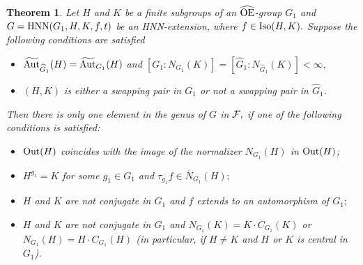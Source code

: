 \documentclass[a4paper,12pt]{article}
\newtheorem{thm}{Theorem}[section]
\newcommand{\Oe}{\rm \widehat{OE}}
\newcommand{\F}{{\cal F}}
\def\aut {{\rm Aut}}
\def\out {{\rm Out}}
\def\inn {{\rm Inn}}
\def\hnn {{\rm HNN}}
\def\Iso {{\rm Iso}}
\begin{document}
\begin{thm}\label{genus 1 intr}
Let $H$ and $K$ be a finite subgroups of an $\Oe$-group $G_1$ and $G=\hnn(G_1, H, K, f, t)$ be an HNN-extension, where $f \in \Iso(H, K).$ 
Suppose the following conditions are satisfied \begin{itemize}
    \item $\widetilde{\aut}_{\widehat{G}_1}(H)=\widetilde{\aut}_{G_1}(H)$ and $[G_1:N_{G_1}(K)]=[\widehat G_1:N_{\widehat G_1}(K)]<\infty$,
    \item  $(H,K)$ is either a swapping pair in $G_1$ or not a swapping pair in $\widehat G_1$. 

\end{itemize} Then there is only one element in the genus of $G$ in $\F,$ if one of the following conditions is satisfied:

\begin{itemize}


\item[i)]  $\out(H)$  coincides with the image of the normalizer $N_{G_1}(H)$ in $\out(H)$;

\item[ii)] %
$H^{g_1}=K$ for some $g_1 \in G_1$ and $\tau_{g_1} f\in \overline{N}_{G_1}(H);$

    \item [iii)] $H$ and $K$ are not conjugate in $G_1$ and $f$ extends to an automorphism of $G_1;$  
    \item [iv)] $H$ and $K$ are not conjugate in $G_1$ and $N_{G_1}(K)=K \cdot C_{G_1}(K)$ or $N_{G_1}(H)=H \cdot C_{G_1}(H)$ (in particular, if $H \neq K$ and $H$ or $K$ is central in $G_1$).  
\end{itemize}
\end{thm}
\end{document}
